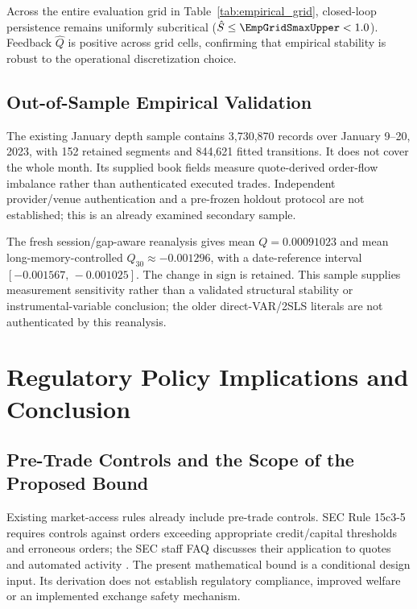 \documentclass[12pt]{article}
\theoremstyle{definition}
\theoremstyle{remark}
\begin{document}
\begin{table}[htbp]
\centering
\caption{\textbf{Sensitivity of Empirical Feedback Invariants to Sampling Frequency ($\Delta$) and Horizon Window ($W$).}
Estimated persistence $\hat{S}$, feedback parameter $\hat{Q}$, and loop ratio $\hat{\mathcal{L}}$ across sampling intervals $\Delta \in \{1\text{s}, 10\text{s}, 60\text{s}\}$ and moving average window lengths $W \in \{60\text{s}, 300\text{s}, 900\text{s}\}$. Here $a_{\text{EMA}}$ denotes the mechanical filter anchor, distinct from the empirical return autoregression $\hat{J}_{11}$. 95\% confidence intervals in brackets.}
\label{tab:empirical_grid}
\resizebox{\textwidth}{!}{%
%
}
\end{table}

Across the entire evaluation grid in Table~\ref{tab:empirical_grid}, closed-loop persistence remains uniformly subcritical ($\hat{S} \le \EmpGridSmaxUpper < 1.0$). Feedback $\hat{Q}$ is positive across \EmpGridQallPositive{} grid cells, confirming that empirical stability is robust to the operational discretization choice.
\subsection{Out-of-Sample Empirical Validation}
The existing January depth sample contains 3,730,870 records over January 9--20, 2023, with 152 retained segments and 844,621 fitted transitions. It does not cover the whole month. Its supplied book fields measure quote-derived order-flow imbalance rather than authenticated executed trades. Independent provider/venue authentication and a pre-frozen holdout protocol are not established; this is an already examined secondary sample.

The fresh session/gap-aware reanalysis gives mean $Q=0.00091023$ and mean long-memory-controlled $Q_{30}\approx-0.001296$, with a date-reference interval $[-0.001567,\,\allowbreak -0.001025]$. The change in sign is retained. This sample supplies measurement sensitivity rather than a validated structural stability or instrumental-variable conclusion; the older direct-VAR/2SLS literals are not authenticated by this reanalysis.

\section{Regulatory Policy Implications and Conclusion}
\label{sec:policy_conclusion}

\subsection{Pre-Trade Controls and the Scope of the Proposed Bound}
Existing market-access rules already include pre-trade controls. SEC Rule 15c3-5 requires controls against orders exceeding appropriate credit/capital thresholds and erroneous orders; the SEC staff FAQ discusses their application to quotes and automated activity \citep{sec2010marketaccess,sec2017marketaccessfaq}. The present mathematical bound is a conditional design input. Its derivation does not establish regulatory compliance, improved welfare or an implemented exchange safety mechanism.
\end{document}
